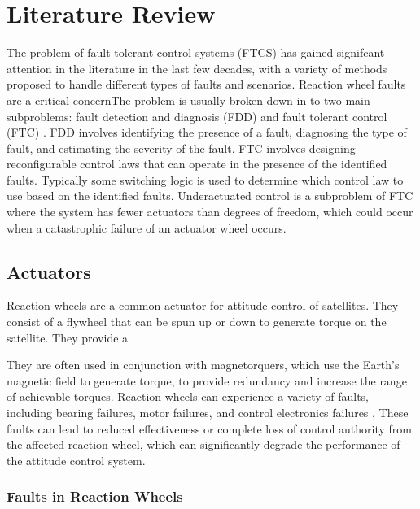 
\chapter{Literature Review}
\label{chap:literature_review}

The problem of fault tolerant control systems (FTCS) has gained signifcant attention in the literature in the last few decades, with a variety of methods proposed to handle different types of faults and scenarios. Reaction wheel faults are a critical concernThe problem is usually broken down in to two main subproblems: fault detection and diagnosis (FDD) and fault tolerant control (FTC) \cite{yinReviewRecentDevelopment2016}. FDD involves identifying the presence of a fault, diagnosing the type of fault, and estimating the severity of the fault. FTC involves designing reconfigurable control laws that can operate in the presence of the identified faults. Typically some switching logic is used to determine which control law to use based on the identified faults. Underactuated control is a subproblem of FTC where the system has fewer actuators than degrees of freedom, which could occur when a catastrophic failure of an actuator wheel occurs.

\section{Actuators}
Reaction wheels are a common actuator for attitude control of satellites. They consist of a flywheel that can be spun up or down to generate torque on the satellite. They provide a 

They are often used in conjunction with magnetorquers, which use the Earth's magnetic field to generate torque, to provide redundancy and increase the range of achievable torques. 
Reaction wheels can experience a variety of faults, including bearing failures, motor failures, and control electronics failures \cite{shenActiveFaulttolerantControl2019}. These faults can lead to reduced effectiveness or complete loss of control authority from the affected reaction wheel, which can significantly degrade the performance of the attitude control system.
\subsection{Faults in Reaction Wheels}

